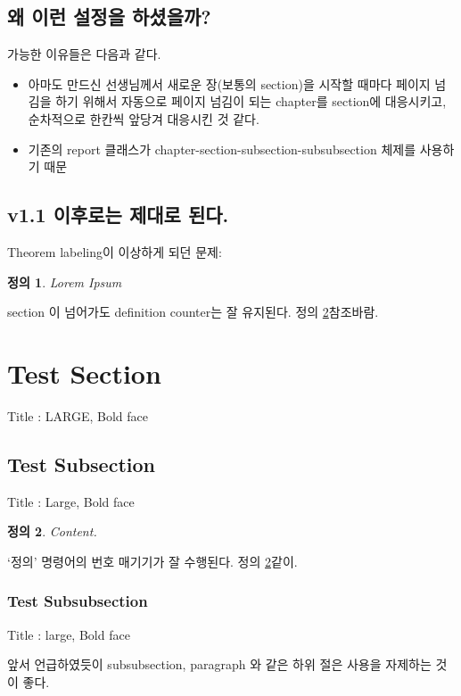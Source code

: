 \documentclass{gshs-report-v1.2}
\newtheorem{definition}{정의}
\begin{document}
\subsection{왜 이런 설정을 하셨을까?}
가능한 이유들은 다음과 같다.
\begin{itemize}
	\item 아마도 만드신 선생님께서 새로운 장(보통의 section)을 시작할 때마다 페이지 넘김을 하기 위해서 자동으로 페이지 넘김이 되는 chapter를 section에 대응시키고, 순차적으로 한칸씩 앞당겨 대응시킨 것 같다. 
	\item 기존의 report 클래스가 chapter-section-subsection-subsubsection 체제를 사용하기 때문
\end{itemize}

\subsection{v1.1 이후로는 제대로 된다.}
Theorem labeling이 이상하게 되던 문제:
\begin{definition}
	Lorem Ipsum
\end{definition}

section 이 넘어가도 definition counter는 잘 유지된다. 정의 \ref{def_test}\을 참조바람.


\section{Test Section}

Title : LARGE, Bold face

\subsection{Test Subsection}

Title : Large, Bold face

\begin{definition} \label{def_test}
	Content.
\end{definition}

`정의' 명령어의 번호 매기기가 잘 수행된다. 정의 \ref{def_test}\과 같이. %

\subsubsection{Test Subsubsection}

Title : large, Bold face

앞서 언급하였듯이 subsubsection, paragraph 와 같은 하위 절은 사용을 자제하는 것이 좋다.
\end{document}
